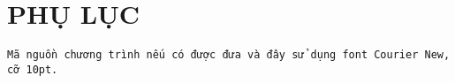 
\section*{PHỤ LỤC}
\texttt{\fontsize{10pt}{0pt}\selectfont Mã nguồn chương trình nếu có được đưa và đây sử dụng font 
Courier New, cỡ 10pt.}

\clearpage